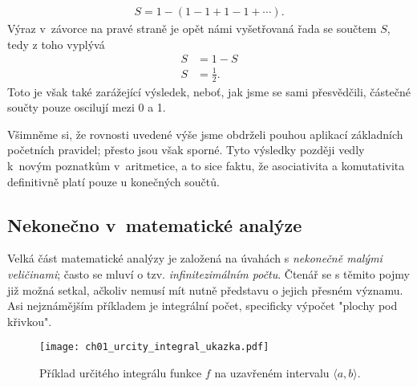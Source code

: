 \begin{align*}
S=1-(1-1+1-1+\cdots ).
\end{align*}
Výraz v~závorce na pravé straně je opět námi vyšetřovaná řada se součtem $S$, tedy z toho vyplývá
\begin{align*}
S&=1-S\\
S&=\frac{1}{2} .
\end{align*}
Toto je však také zarážející výsledek, neboť, jak jsme se sami přesvědčili, částečné součty pouze oscilují mezi 0 a 1.\par
Všimněme si, že rovnosti uvedené výše jsme obdrželi pouhou aplikací základních početních pravidel; přesto jsou však sporné. Tyto výsledky později vedly k~novým poznatkům v~aritmetice, a to sice faktu, že asociativita a komutativita definitivně platí pouze u konečných součtů.

\subsection{Nekonečno v~matematické analýze}

Velká část matematické analýzy je založená na úvahách s \emph{nekonečně malými veličinami}; často se mluví o tzv. \emph{infinitezimálním počtu}. Čtenář se s těmito pojmy již možná setkal, ačkoliv nemusí mít nutně představu o jejich přesném významu. Asi nejznámějším příkladem je integrální počet, specificky výpočet "plochy pod křivkou".
\begin{figure}[H]
	\centering
	\texttt{[image: ch01\_urcity\_integral\_ukazka.pdf]}
	\caption{Příklad určitého integrálu funkce $f$ na uzavřeném intervalu $\langle a,b \rangle$.}
	\label{fig:urcity_integral_ukazka}
\end{figure}

